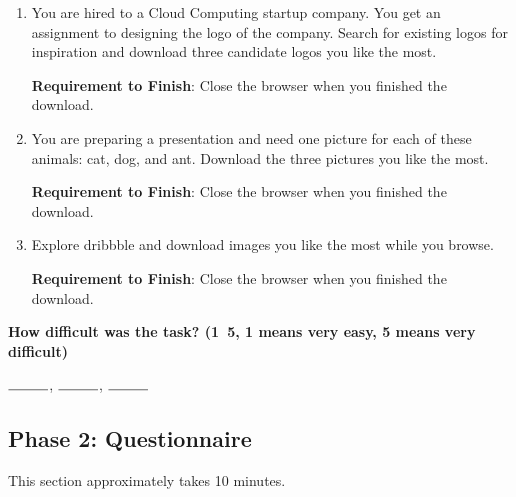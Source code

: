 \begin{enumerate}
    \item You are hired to a Cloud Computing startup company. You get an assignment to 
    designing the logo of the company. Search for existing logos for inspiration and 
    download three candidate logos you like the most.

    \textbf{Requirement to Finish}: Close the browser when you finished the download.

    \item You are preparing a presentation and need one picture for each of these animals: 
    cat, dog, and ant. Download the three pictures you like the most.

    \textbf{Requirement to Finish}: Close the browser when you finished the download.

    \item Explore dribbble and download images you like the most while you browse.
    
    \textbf{Requirement to Finish}: Close the browser when you finished the download.

\end{enumerate}

\textbf{How difficult was the task? (1~5, 1 means very easy, 5 means very difficult)}

$\rule{1cm}{0.15mm}$, $\rule{1cm}{0.15mm}$, $\rule{1cm}{0.15mm}$

\subsection{Phase 2: Questionnaire}

This section approximately takes 10 minutes.

